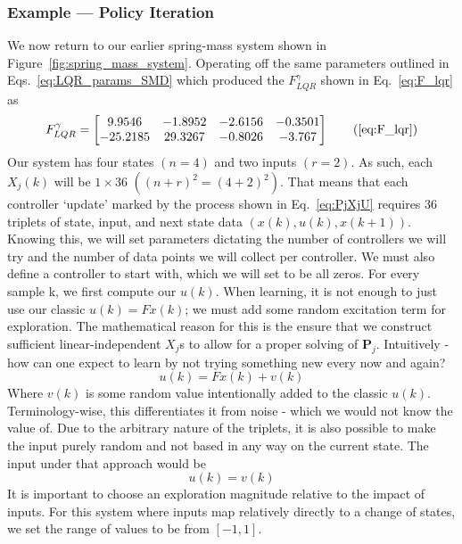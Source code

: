 \FloatBarrier\subsubsection{Example --- Policy Iteration} %
We now return to our earlier spring-mass system shown in Figure~\ref{fig:spring_mass_system}. Operating off the same parameters outlined in Eqs.~\ref{eq:LQR_params_SMD} which produced the $F_{LQR}^\gamma$ shown in Eq.~\ref{eq:F_lqr} as
\begin{equation}
    F_{LQR}^\gamma=\left[\begin{matrix}9.9546&-1.8952&-2.6156&-0.3501\\-25.2185&29.3267&-0.8026&-3.767\\\end{matrix}\right]
    \tag{\ref{eq:F_lqr}}
\end{equation}
Our system has four states $(n=4)$ and two inputs $(r=2)$. As such, each $X_j\left(k\right)$ will be $1\times 36$ $({\left(n+r\right)}^2={\left(4+2\right)}^2)$. That means that each controller `update' marked by the process shown in Eq.~\ref{eq:PjXjU} requires 36 triplets of state, input, and next state data $(x(k), u(k), x(k+1))$.
Knowing this, we will set parameters dictating the number of controllers we will try and the number of data points we will collect per controller. We must also define a controller to start with, which we will set to be all zeros.
For every sample k, we first compute our $u\left(k\right)$. When learning, it is not enough to just use our classic $u\left(k\right)=Fx\left(k\right)$; we must add some random excitation term for exploration. The mathematical reason for this is the ensure that we construct sufficient linear-independent $X_j$s to allow for a proper solving of $\textbf{P}_j$. Intuitively - how can one expect to learn by not trying something new every now and again?
\begin{equation}
    u\left(k\right)=Fx\left(k\right)+v\left(k\right)
    \label{eq:input_with_exploration}
\end{equation}
Where $v\left(k\right)$ is some random value intentionally added to the classic $u\left(k\right)$. Terminology-wise, this differentiates it from noise - which we would not know the value of. Due to the arbitrary nature of the triplets, it is also possible to make the input purely random and not based in any way on the current state. The input under that approach would be
\begin{equation}
    u\left(k\right)=v\left(k\right)
\end{equation}
It is important to choose an exploration magnitude relative to the impact of inputs. For this system where inputs map relatively directly to a change of states, we set the range of values to be from $\left[-1,1\right]$. 

